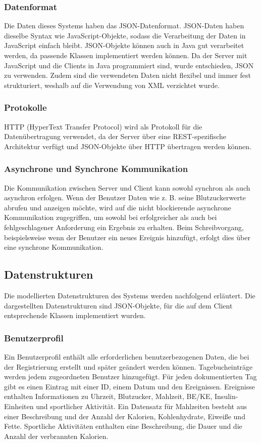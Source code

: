 	\subsubsection{Datenformat}
	Die Daten dieses Systems haben das JSON-Datenformat. JSON-Daten haben dieselbe Syntax wie JavaScript-Objekte, sodass die Verarbeitung der Daten in JavaScript einfach bleibt. JSON-Objekte können auch in Java gut verarbeitet werden, da passende Klassen implementiert werden können. Da der Server mit JavaScript und die Clients in Java programmiert sind, wurde entschieden, JSON zu verwenden. Zudem sind die verwendeten Daten nicht flexibel und immer fest strukturiert, weshalb auf die Verwendung von XML verzichtet wurde.
	\subsubsection{Protokolle}
	HTTP (HyperText Transfer Protocol) wird als Protokoll für die Datenübertragung verwendet, da der Server über eine REST-spezifische Architektur verfügt und JSON-Objekte über HTTP übertragen werden können.
	\subsubsection{Asynchrone und Synchrone Kommunikation}
	Die Kommunikation zwischen Server und Client kann sowohl synchron als auch asynchron erfolgen. Wenn der Benutzer Daten wie z. B. seine Blutzuckerwerte abrufen und anzeigen möchte, wird auf die nicht blockierende asynchrone Kommunikation zugegriffen, um sowohl bei erfolgreicher als auch bei fehlgeschlagener Anforderung ein Ergebnis zu erhalten. Beim Schreibvorgang, beispielsweise wenn der Benutzer ein neues Ereignis hinzufügt, erfolgt dies über eine synchrone Kommunikation.	
\subsection{Datenstrukturen}
	Die modellierten Datenstrukturen des Systems werden nachfolgend erläutert. Die dargestellten Datenstrukturen sind JSON-Objekte, für die auf dem Client entsprechende Klassen implementiert wurden.
	\subsubsection{Benutzerprofil}
	Ein Benutzerprofil enthält alle erforderlichen benutzerbezogenen Daten, die bei der Registrierung erstellt und später geändert werden können. Tagebucheinträge werden jedem zugeordneten Benutzer hinzugefügt. Für jeden dokumentierten Tag gibt es einen Eintrag mit einer ID, einem Datum und den Ereignissen. Ereignisse enthalten Informationen zu Uhrzeit, Blutzucker, Mahlzeit, BE/KE, Insulin-Einheiten und sportlicher Aktivität. Ein Datensatz für Mahlzeiten besteht aus einer Beschreibung und der Anzahl der Kalorien, Kohlenhydrate, Eiweiße und Fette. Sportliche Aktivitäten enthalten eine Beschreibung, die Dauer und die Anzahl der verbrannten Kalorien.
	
